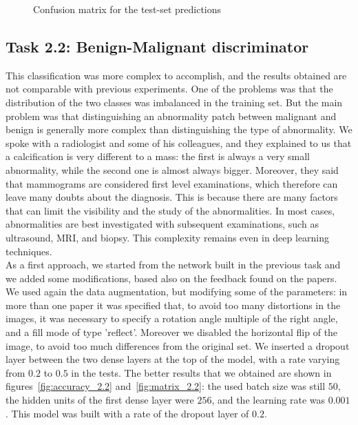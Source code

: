 \documentclass[11pt,a4paper,oneside]{article}
\begin{document}
\begin{figure}[hb]
\begin{minipage}[c]{.4\textwidth}
		\caption{Confusion matrix for the test-set predictions}
		\label{fig:scratch_matrix_da}
	\end{minipage}%
\end{figure}

\clearpage

\subsection{Task 2.2: Benign-Malignant discriminator}
This classification was more complex to accomplish, and the results obtained are not comparable with previous experiments. One of the problems was that the distribution of the two classes was imbalanced in the training set. But the main problem was that distinguishing an abnormality patch between malignant and benign is generally more complex than distinguishing the type of abnormality. 
We spoke with a radiologist and some of his colleagues, and they explained to us that a calcification is very different to a mass: the first is always a very small abnormality, while the second one is almost always bigger. Moreover, they said that mammograms are considered first level examinations, which therefore can leave many doubts about the diagnosis. This is because there are many factors that can limit the visibility and the study of the abnormalities. 
In most cases, abnormalities are best investigated with subsequent examinations, such as ultrasound, MRI, and biopsy.
This complexity remains even in deep learning techniques.\\


As a first approach, we started from the network built in the previous task and we added some modifications, based also on the feedback found on the papers.
We used again the data augmentation, but modifying some of the parameters: in more than one paper it was specified that, to avoid too many distortions in the images, it was necessary to specify a rotation angle multiple of the right angle, and a fill mode of type 'reflect'. Moreover we disabled the horizontal flip of the image, to avoid too much differences from the original set.
We inserted a dropout layer between the two dense layers at the top of the model, with a rate varying from $0.2$ to $0.5$ in the tests.
The better results that we obtained are shown in figures~\ref{fig:accuracy_2.2} and~\ref{fig:matrix_2.2}: the used batch size was still $50$, the hidden units of the first dense layer were $256$, and the learning rate was $0.001$. This model was built with a rate of the dropout layer of $0.2$. 
\end{document}
